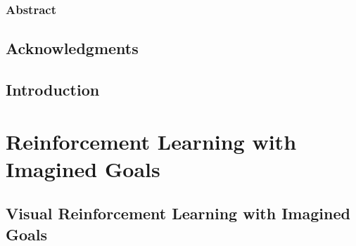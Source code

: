 \documentclass[ titlepage,numbers=noenddot,headinclude,
                footinclude=true,cleardoublepage=empty,abstractoff,
                BCOR=5mm,paper=letter,fontsize=12pt,
                american,
                openany
                ]{scrreprt}
\newcommand\blankpage{%
    \null
    \thispagestyle{empty}%
    \addtocounter{page}{-1}%
    \newpage}
\begin{document}
\frenchspacing
\raggedbottom
{}




\afterpage{\blankpage}

\setcounter{page}{1}
\section*{Abstract}

\newpage

\setcounter{page}{1}%

\begingroup
\let\clearpage\relax
\let\cleardoublepage\relax
\let\cleardoublepage\relax
\chapter*{Acknowledgments}

\endgroup


\pagestyle{firstpage}



\setcounter{page}{1}

\chapter{Introduction}\label{chapter:intro}



 \part{Reinforcement Learning with Imagined Goals}

 \chapter{Visual Reinforcement Learning with Imagined Goals}\label{chapter:rig}


\end{document}
